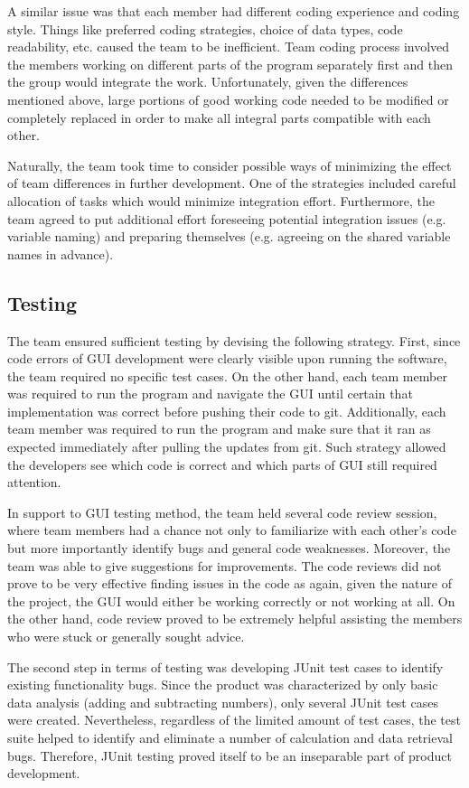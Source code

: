 \documentclass{l3proj}
\begin{document}
A similar issue was that each member had different coding experience and coding style. 
Things like preferred coding strategies, choice of data types, code readability, etc. caused the team to be inefficient. 
Team coding process involved the members working on different parts of the program separately first and then the group would integrate the work. 
Unfortunately, given the differences mentioned above, large portions of good working code needed to be modified or completely replaced in order to make 
all integral parts compatible with each other. 

Naturally, the team took time to consider possible ways of minimizing the effect of team differences in further development. 
One of the strategies included careful allocation of tasks which would minimize integration effort. Furthermore, the team agreed to put additional effort 
foreseeing potential integration issues (e.g. variable naming) and preparing themselves (e.g. agreeing on the shared variable names in advance).

\subsection{Testing}
The team ensured sufficient testing by devising the following strategy. First, since code errors of GUI development were clearly visible upon running the 
software, the team required no specific test cases. On the other hand, each team member was required to run the program and navigate the GUI until certain 
that implementation was correct before pushing their code to git. Additionally, each team member was required to run the program and make sure that it ran 
as expected immediately after pulling the updates from git. Such strategy allowed the developers see which code is correct and which parts of GUI still 
required attention.

In support to GUI testing method, the team held several code review session, where team members had a chance not only to familiarize with each other’s code 
but more importantly identify bugs and general code weaknesses. Moreover, the team was able to give suggestions for improvements. The code reviews did not 
prove to be very effective finding issues in the code as again, given the nature of the project, the GUI would either be working correctly or not working 
at all. On the other hand, code review proved to be extremely helpful assisting the members who were stuck or generally sought advice.

The second step in terms of testing was developing JUnit test cases to identify existing functionality bugs. Since the product was characterized by only 
basic data analysis (adding and subtracting numbers), only several JUnit test cases were created. Nevertheless, regardless of the limited amount of test 
cases, the test suite helped to identify and eliminate a number of calculation and data retrieval bugs. Therefore, JUnit testing proved itself to be an 
inseparable part of product development.
\end{document}
